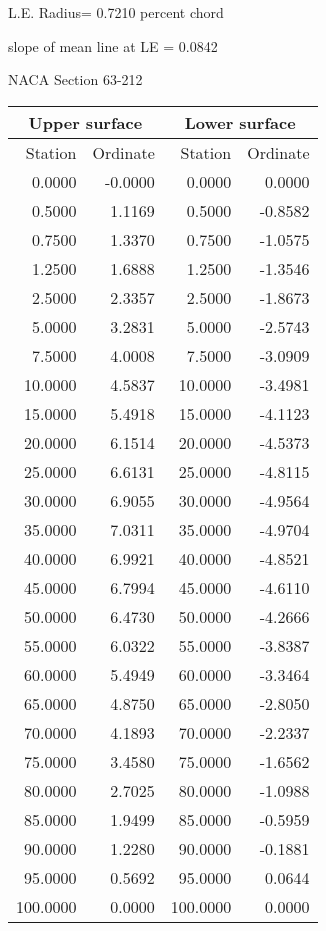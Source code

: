 \documentclass[11pt]{book}
\begin{document}
L.E. Radius=  0.7210 percent chord


 slope of mean line at LE =  0.0842
 \newpage
  \label{s63-212}
 \begin{Large}
 NACA Section 63-212
 \end{Large}
  
 \vspace{8mm}
 \begin{tabular}{|r|r|r|r|} \hline 
 \multicolumn{2}{|c|}{Upper surface} & \multicolumn{2}{|c|}{Lower surface} \\
 \hline
 Station & Ordinate & Station & Ordinate \\
 \hline
0.0000 & -0.0000 & 0.0000 & 0.0000 \\
0.5000 & 1.1169 & 0.5000 & -0.8582 \\
0.7500 & 1.3370 & 0.7500 & -1.0575 \\
1.2500 & 1.6888 & 1.2500 & -1.3546 \\
2.5000 & 2.3357 & 2.5000 & -1.8673 \\
5.0000 & 3.2831 & 5.0000 & -2.5743 \\
7.5000 & 4.0008 & 7.5000 & -3.0909 \\
10.0000 & 4.5837 & 10.0000 & -3.4981 \\
15.0000 & 5.4918 & 15.0000 & -4.1123 \\
20.0000 & 6.1514 & 20.0000 & -4.5373 \\
25.0000 & 6.6131 & 25.0000 & -4.8115 \\
30.0000 & 6.9055 & 30.0000 & -4.9564 \\
35.0000 & 7.0311 & 35.0000 & -4.9704 \\
40.0000 & 6.9921 & 40.0000 & -4.8521 \\
45.0000 & 6.7994 & 45.0000 & -4.6110 \\
50.0000 & 6.4730 & 50.0000 & -4.2666 \\
55.0000 & 6.0322 & 55.0000 & -3.8387 \\
60.0000 & 5.4949 & 60.0000 & -3.3464 \\
65.0000 & 4.8750 & 65.0000 & -2.8050 \\
70.0000 & 4.1893 & 70.0000 & -2.2337 \\
75.0000 & 3.4580 & 75.0000 & -1.6562 \\
80.0000 & 2.7025 & 80.0000 & -1.0988 \\
85.0000 & 1.9499 & 85.0000 & -0.5959 \\
90.0000 & 1.2280 & 90.0000 & -0.1881 \\
95.0000 & 0.5692 & 95.0000 & 0.0644 \\
100.0000 & 0.0000 & 100.0000 & 0.0000 \\
 \hline 
 \end{tabular}
\end{document}
